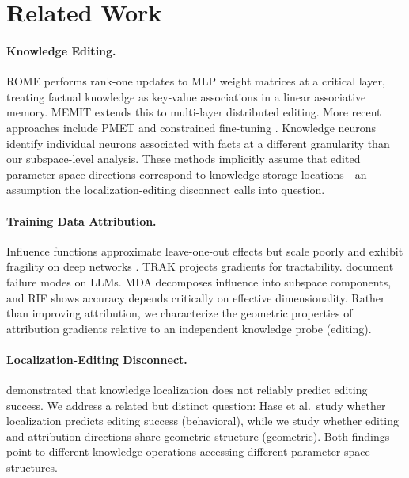 \section{Related Work}
\label{sec:related_work}

\paragraph{Knowledge Editing.}
ROME \citep{meng2022locating} performs rank-one updates to MLP weight matrices at a critical layer, treating factual knowledge as key-value associations in a linear associative memory.
MEMIT \citep{meng2022mass} extends this to multi-layer distributed editing.
More recent approaches include PMET \citep{li2024pmet} and constrained fine-tuning \citep{zhu2020modifying}.
Knowledge neurons \citep{dai2022knowledge} identify individual neurons associated with facts at a different granularity than our subspace-level analysis.
These methods implicitly assume that edited parameter-space directions correspond to knowledge storage locations---an assumption the localization-editing disconnect \citep{hase2023does} calls into question.

\paragraph{Training Data Attribution.}
Influence functions \citep{koh2017understanding} approximate leave-one-out effects but scale poorly and exhibit fragility on deep networks \citep{basu2021influence}.
TRAK \citep{park2023trak} projects gradients for tractability.
\citet{wang2024influence} document failure modes on LLMs.
MDA \citep{kwon2024mda} decomposes influence into subspace components, and RIF \citep{tang2025rif} shows accuracy depends critically on effective dimensionality.
Rather than improving attribution, we characterize the geometric properties of attribution gradients relative to an independent knowledge probe (editing).

\paragraph{Localization-Editing Disconnect.}
\citet{hase2023does} demonstrated that knowledge localization does not reliably predict editing success.
We address a related but distinct question: Hase et al.\ study whether localization predicts editing success (behavioral), while we study whether editing and attribution directions share geometric structure (geometric).
Both findings point to different knowledge operations accessing different parameter-space structures.

